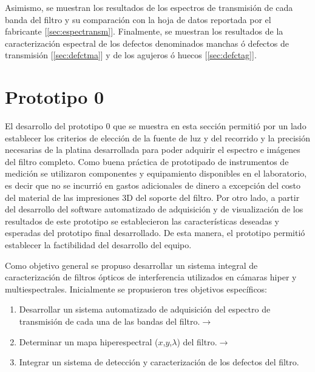 Asimismo, se muestran los resultados de los espectros de transmisión de cada banda del filtro y su comparación con la hoja de datos reportada por el fabricante [\ref{sec:espectransm}]. Finalmente, se muestran los resultados de la caracterización espectral de los defectos denominados manchas ó defectos de transmisión [\ref{sec:defctma}] y de los agujeros ó huecos [\ref{sec:defctag}].


\singlespacing
\section{Prototipo 0 \href{https://github.com/jrr1984/Prototipo0\_S-D\_SpectralGUI/blob/master/barrido/std/main.py}{\faGithub}}
\label{sec:prot0}

\hspace{0.5cm}El desarrollo del prototipo 0 que se muestra en esta sección permitió por un lado establecer los criterios de elección de la fuente de luz y del recorrido y la precisión necesarias de la platina desarrollada para poder adquirir el espectro e imágenes del filtro completo. Como buena práctica de prototipado de instrumentos de medición se utilizaron componentes y equipamiento disponibles en el laboratorio, es decir que no se incurrió en gastos adicionales de dinero a excepción del costo del material de las impresiones 3D del soporte del filtro. Por otro lado, a partir del desarrollo del software automatizado de adquisición y de visualización de los resultados de este prototipo se establecieron las características deseadas y esperadas del prototipo final desarrollado. De esta manera, el prototipo permitió establecer la factibilidad del desarrollo del equipo.

Como objetivo general se propuso desarrollar un sistema integral de caracterización de filtros ópticos de interferencia utilizados en cámaras hiper y multiespectrales. Inicialmente se propusieron tres objetivos específicos:
\begin{enumerate}
\item Desarrollar un sistema automatizado de adquisición del espectro de transmisión de cada una de las bandas del filtro.$\xrightarrow{}$ \href{https://github.com/jrr1984/Prototipo0\_S-D\_SpectralGUI/blob/master/barrido/std}{\faGithub}

\item Determinar un mapa hiperespectral ($\textit{x}$,$\textit{y}$,$\lambda$) del filtro.$\xrightarrow{}$ \href{https://github.com/jrr1984/Prototipo0\_S-D\_SpectralGUI/blob/master/spectral\_gui/main.py}{\faGithub}

\item Integrar un sistema de detección y caracterización de los defectos del filtro.
\end{enumerate}

